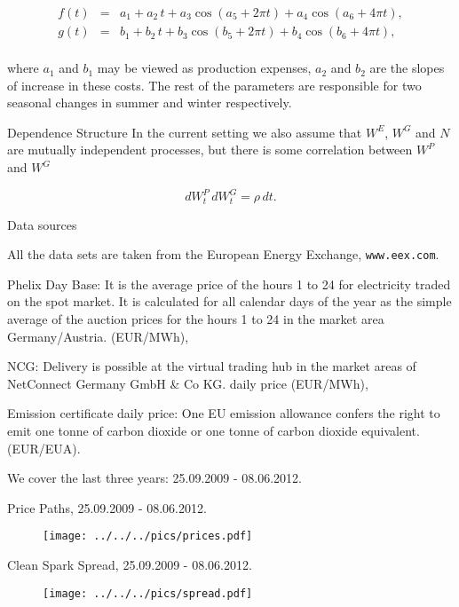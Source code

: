 \begin{eqnarray}
f(t) &=& a_1 + a_2\,t + a_3\cos(a_5 + 2\pi t) + a_4\cos(a_6 + 4\pi t), \nonumber \\
g(t) &=& b_1 + b_2\,t + b_3\cos(b_5 + 2\pi t) + b_4\cos(b_6 + 4\pi t), \nonumber \\
\label{grseasonality}
\end{eqnarray}

where $a_1$ and $b_1$ may be viewed as production expenses, $a_2$ and $b_2$ are the slopes of increase in these costs. The rest of the parameters are responsible for two seasonal changes in summer and winter respectively.

{Dependence Structure}
In the current setting we also assume that $W^E$, $W^G$ and $N$ are mutually independent processes, but there is some correlation between  $W^P$ and $W^G$

\begin{equation}
d{W}^P_t\,d{W}^G_t = \rho\,d{t}.
\label{corr}
\end{equation}

{Data sources}


	All the data sets are taken from the European Energy Exchange, \texttt{www.eex.com}.

	Phelix Day Base: It is the average price of the hours 1 to 24 for electricity traded on the spot market.
It is calculated for all calendar days of the year as the simple average of the auction prices for the
hours 1 to 24 in the market area Germany/Austria. (EUR/MWh),

	NCG: Delivery is possible at the virtual trading hub in the market areas of
NetConnect Germany GmbH \& Co KG. daily price (EUR/MWh),

	Emission certificate daily price: One EU emission allowance confers the right to emit one tonne of carbon dioxide or one tonne of
carbon dioxide equivalent. (EUR/EUA).

	We cover the last three years: 25.09.2009 - 08.06.2012.


{Price Paths, 25.09.2009 - 08.06.2012.}
\begin{figure}[htp]
\centering
\texttt{[image: ../../../pics/prices.pdf]}
\label{prices}
\end{figure}

{Clean Spark Spread, 25.09.2009 - 08.06.2012.}
\begin{figure}[htp]
\centering
\texttt{[image: ../../../pics/spread.pdf]}
\label{spread}
\end{figure}

